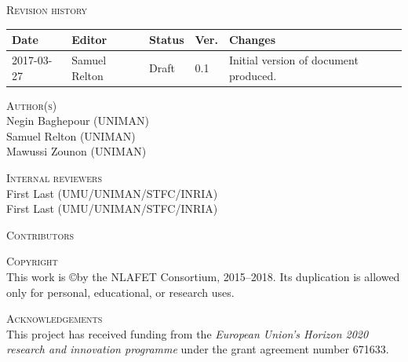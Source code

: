 \documentclass[a4paper,12pt]{article}
\begin{document}
\vspace{2em}




\noindent
\textsc{Revision history}\\[1em]
\begin{tabularx}{\linewidth}{@{}|l|l|l|l|X|}
  \hline
  \rowcolor{orange}
  \bf Date & \bf Editor & \bf Status & \bf Ver. & \bf Changes \\
  \hline
  2017-03-27 & Samuel Relton & Draft & 0.1 & Initial version of
                                             document produced. \\
  \hline
\end{tabularx}

\vspace{2em}




\noindent
\textsc{Author(s)}\\[1em]
Negin Baghepour (UNIMAN)\\
Samuel Relton (UNIMAN)\\
Mawussi Zounon (UNIMAN)

\vspace{2em}

\noindent
\textsc{Internal reviewers}\\[1em]
First Last (UMU/UNIMAN/STFC/INRIA)\\
First Last (UMU/UNIMAN/STFC/INRIA)

\vspace{2em}


\noindent
\textsc{Contributors}\\[1em]

\vspace{2em}





\noindent
\textsc{Copyright}\\[1em]
This work is \copyright by the NLAFET Consortium, 2015--2018.
Its duplication is allowed only for personal, educational, or research uses.

\vspace{2em}





\noindent
\textsc{Acknowledgements}\\[1em]
This project has received funding from the \emph{European Union's Horizon 2020 research and innovation programme} under the grant agreement number 671633.
\end{document}
